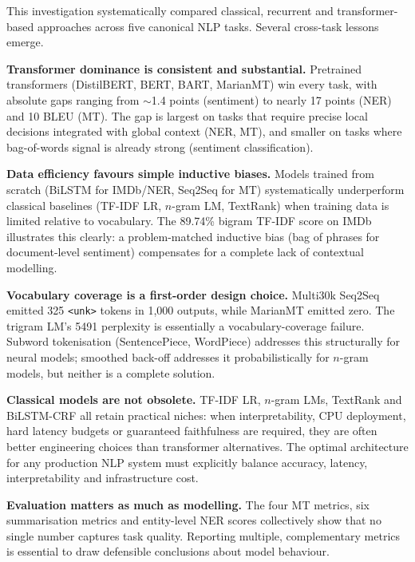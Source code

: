 \documentclass[11pt,a4paper]{article}
\begin{document}
This investigation systematically compared classical, recurrent and transformer-based approaches across five canonical NLP tasks. Several cross-task lessons emerge.

\textbf{Transformer dominance is consistent and substantial.} Pretrained transformers (DistilBERT, BERT, BART, MarianMT) win every task, with absolute gaps ranging from $\sim$1.4 points (sentiment) to nearly 17 points (NER) and 10 BLEU (MT). The gap is largest on tasks that require precise local decisions integrated with global context (NER, MT), and smaller on tasks where bag-of-words signal is already strong (sentiment classification).

\textbf{Data efficiency favours simple inductive biases.} Models trained from scratch (BiLSTM for IMDb/NER, Seq2Seq for MT) systematically underperform classical baselines (TF-IDF LR, $n$-gram LM, TextRank) when training data is limited relative to vocabulary. The 89.74\% bigram TF-IDF score on IMDb illustrates this clearly: a problem-matched inductive bias (bag of phrases for document-level sentiment) compensates for a complete lack of contextual modelling.

\textbf{Vocabulary coverage is a first-order design choice.} Multi30k Seq2Seq emitted 325 \texttt{<unk>} tokens in 1{,}000 outputs, while MarianMT emitted zero. The trigram LM's 5491 perplexity is essentially a vocabulary-coverage failure. Subword tokenisation (SentencePiece, WordPiece) addresses this structurally for neural models; smoothed back-off addresses it probabilistically for $n$-gram models, but neither is a complete solution.

\textbf{Classical models are not obsolete.} TF-IDF LR, $n$-gram LMs, TextRank and BiLSTM-CRF all retain practical niches: when interpretability, CPU deployment, hard latency budgets or guaranteed faithfulness are required, they are often better engineering choices than transformer alternatives. The optimal architecture for any production NLP system must explicitly balance accuracy, latency, interpretability and infrastructure cost.

\textbf{Evaluation matters as much as modelling.} The four MT metrics, six summarisation metrics and entity-level NER scores collectively show that no single number captures task quality. Reporting multiple, complementary metrics is essential to draw defensible conclusions about model behaviour.
\end{document}
